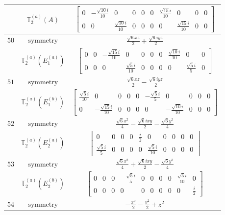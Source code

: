 \documentclass[fleqn,8pt,landscape]{jsarticle}
\begin{document}
\begin{longtable}{ccc}
$  $ & $ \mathbb{T}_{2}^{(a)}(A) $ & $ \begin{bmatrix} 0 & - \frac{\sqrt{10} i}{10} & 0 & 0 & 0 & 0 & \frac{\sqrt{15} i}{10} & 0 & 0 & 0 \\ 0 & 0 & \frac{\sqrt{10} i}{10} & 0 & 0 & 0 & 0 & \frac{\sqrt{15} i}{10} & 0 & 0 \end{bmatrix} $ \\ \hline
$ 50 $ & $ \text{symmetry} $ & $ \frac{\sqrt{6} x z}{2} + \frac{\sqrt{6} i y z}{2} $ \\
$  $ & $ \mathbb{T}_{2}^{(a)}(E_{1}^{(a)}) $ & $ \begin{bmatrix} 0 & 0 & - \frac{\sqrt{15} i}{10} & 0 & 0 & 0 & 0 & \frac{\sqrt{10} i}{10} & 0 & 0 \\ 0 & 0 & 0 & \frac{\sqrt{5} i}{10} & 0 & 0 & 0 & 0 & \frac{\sqrt{5} i}{5} & 0 \end{bmatrix} $ \\ \hline
$ 51 $ & $ \text{symmetry} $ & $ \frac{\sqrt{6} x z}{2} - \frac{\sqrt{6} i y z}{2} $ \\
$  $ & $ \mathbb{T}_{2}^{(a)}(E_{1}^{(b)}) $ & $ \begin{bmatrix} \frac{\sqrt{5} i}{10} & 0 & 0 & 0 & 0 & - \frac{\sqrt{5} i}{5} & 0 & 0 & 0 & 0 \\ 0 & - \frac{\sqrt{15} i}{10} & 0 & 0 & 0 & 0 & - \frac{\sqrt{10} i}{10} & 0 & 0 & 0 \end{bmatrix} $ \\ \hline
$ 52 $ & $ \text{symmetry} $ & $ \frac{\sqrt{6} x^{2}}{4} - \frac{\sqrt{6} i x y}{2} - \frac{\sqrt{6} y^{2}}{4} $ \\
$  $ & $ \mathbb{T}_{2}^{(a)}(E_{2}^{(a)}) $ & $ \begin{bmatrix} 0 & 0 & 0 & 0 & \frac{i}{2} & 0 & 0 & 0 & 0 & 0 \\ \frac{\sqrt{5} i}{5} & 0 & 0 & 0 & 0 & \frac{\sqrt{5} i}{10} & 0 & 0 & 0 & 0 \end{bmatrix} $ \\ \hline
$ 53 $ & $ \text{symmetry} $ & $ \frac{\sqrt{6} x^{2}}{4} + \frac{\sqrt{6} i x y}{2} - \frac{\sqrt{6} y^{2}}{4} $ \\
$  $ & $ \mathbb{T}_{2}^{(a)}(E_{2}^{(b)}) $ & $ \begin{bmatrix} 0 & 0 & 0 & - \frac{\sqrt{5} i}{5} & 0 & 0 & 0 & 0 & \frac{\sqrt{5} i}{10} & 0 \\ 0 & 0 & 0 & 0 & 0 & 0 & 0 & 0 & 0 & \frac{i}{2} \end{bmatrix} $ \\ \hline
$ 54 $ & $ \text{symmetry} $ & $ - \frac{x^{2}}{2} - \frac{y^{2}}{2} + z^{2} $ \\

\end{longtable}
\end{document}
